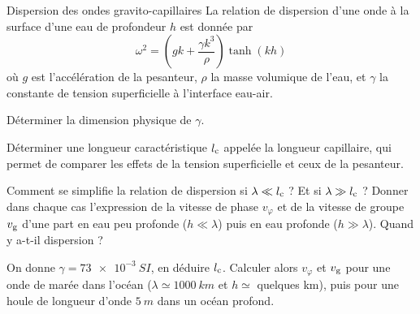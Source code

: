 \begin{exo}[PC][2][TD]{Dispersion des ondes gravito-capillaires}
La relation de dispersion d'une onde à la surface d'une eau de profondeur $h$ est donnée par
\begin{equation}
 \omega^2=\left(gk+\frac{\gamma k^3}{\rho}\right)\tanh(kh)
 \end{equation}
 où $g$ est l'accélération de la pesanteur, $\rho$ la masse volumique de l'eau, et $\gamma$ la constante de tension superficielle à l'interface eau-air.
\begin{quest}
\item Déterminer la dimension physique de $\gamma$.
\item Déterminer une longueur caractéristique $l_{\rm{c}}$ appelée la longueur capillaire, qui permet de comparer les effets de la tension superficielle et ceux de la pesanteur.
\item Comment se simplifie la relation de dispersion si $\lambda\ll l_{\rm{c}}$ ? Et si $\lambda\gg l_{\rm{c}}$ ? Donner dans chaque cas l'expression de la vitesse de phase $v_\varphi$ et de la vitesse de groupe $v_{\rm{g}}$ d'une part en eau peu profonde ($h\ll\lambda$) puis en eau profonde ($h\gg\lambda$). Quand y a-t-il dispersion ?
\item On donne $\gamma=\SI{73e-3}{SI}$, en déduire $l_{\rm{c}}$. Calculer alors $v_\varphi$ et $v_{\rm{g}}$ pour une onde de marée dans l'océan ($\lambda\simeq\SI{1000}{km}$ et $h\simeq$ quelques km), puis pour une houle de longueur d'onde $\SI{5}{m}$ dans un océan profond.
\end{quest}
\end{exo}

